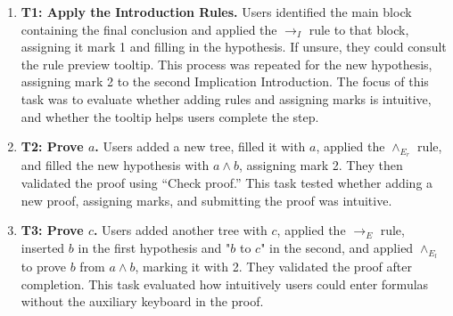 \begin{enumerate}[label={}]
    \item \textbf{T1: Apply the Introduction Rules.} 
    Users identified the main block containing the final conclusion and applied the $\to_I$ rule to that block, assigning it mark 1 and filling in the hypothesis. If unsure, they could consult the rule preview tooltip. This process was repeated for the new hypothesis, assigning mark 2 to the second Implication Introduction. The focus of this task was to evaluate whether adding rules and assigning marks is intuitive, and whether the tooltip helps users complete the step.  
    \begin{center}
    \end{center}

    \item \textbf{T2: Prove $a$.} 
    Users added a new tree, filled it with $a$, applied the $\land_{E_r}$ rule, and filled the new hypothesis with $a \land b$, assigning mark 2. They then validated the proof using ``Check proof.'' This task tested whether adding a new proof, assigning marks, and submitting the proof was intuitive.  
    \begin{center}
    \end{center}

    \item \textbf{T3: Prove $c$.} 
    Users added another tree with $c$, applied the $\to_E$ rule, inserted $b$ in the first hypothesis and "$b$ to $c$" in the second, and applied $\land_{E_l}$ to prove $b$ from $a \land b$, marking it with 2. They validated the proof after completion.  This task evaluated how intuitively users could enter formulas without the auxiliary keyboard in the proof.
    \begin{center}
    \end{center}


\end{enumerate}
